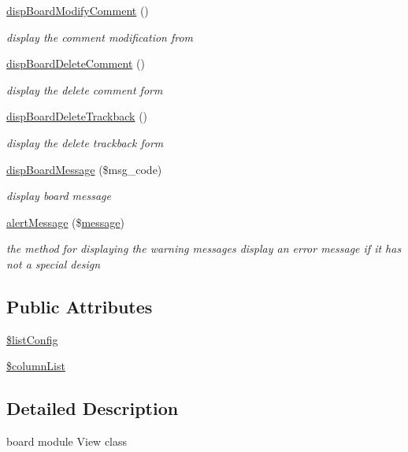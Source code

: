 \begin{DoxyCompactItemize}
\hyperlink{classboardView_a2c26d7a7ea01ac2f6dfd1dbe9c5effce}{disp\+Board\+Modify\+Comment} ()
\begin{DoxyCompactList}\small\item\em display the comment modification from \end{DoxyCompactList}\item 
\hyperlink{classboardView_abb9180578737e27fe2bd16485ccf2df0}{disp\+Board\+Delete\+Comment} ()
\begin{DoxyCompactList}\small\item\em display the delete comment form \end{DoxyCompactList}\item 
\hyperlink{classboardView_aefd0c292301210361b441d848a42a7eb}{disp\+Board\+Delete\+Trackback} ()
\begin{DoxyCompactList}\small\item\em display the delete trackback form \end{DoxyCompactList}\item 
\hyperlink{classboardView_ae42a2efcaf9e04de795a8a895a68fad4}{disp\+Board\+Message} (\$msg\+\_\+code)
\begin{DoxyCompactList}\small\item\em display board message \end{DoxyCompactList}\item 
\hyperlink{classboardView_a421e95c8dd73767264da56ca4d1e360d}{alert\+Message} (\$\hyperlink{classmessage}{message})
\begin{DoxyCompactList}\small\item\em the method for displaying the warning messages display an error message if it has not a special design \end{DoxyCompactList}\end{DoxyCompactItemize}
\subsection*{Public Attributes}
\begin{DoxyCompactItemize}
\item 
\hyperlink{classboardView_a8d64b7032d159a960972ae38f76897f8}{\$list\+Config}
\item 
\hyperlink{classboardView_a44f0d3c92b73c34329708f5fe44652cc}{\$column\+List}
\end{DoxyCompactItemize}


\subsection{Detailed Description}
board module View class 

